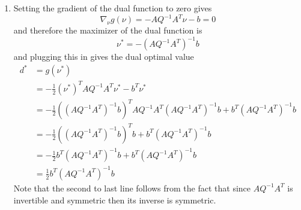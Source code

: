\documentclass[11pt]{amsart}
\begin{document}
\begin{enumerate}
\begin{enumerate}








\item Setting the gradient of the dual function to zero gives
\[
\nabla_{\nu}g(\nu) = -AQ^{-1}A^T \nu - b = 0
\]
and therefore the maximizer of the dual function is 
\[
\nu^* = -(AQ^{-1}A^T)^{-1}b
\]
and plugging this in gives the dual optimal value
\begin{align*}
d^* &= g(\nu^*)\\
&= -\frac{1}{2} (\nu^*)^T  AQ^{-1}A^T \nu^* - b^T \nu^*\\
&= -\frac{1}{2} ((AQ^{-1}A^T)^{-1}b)^T AQ^{-1}A^T (AQ^{-1}A^T)^{-1}b + b^T(AQ^{-1}A^T)^{-1}b\\
&= -\frac{1}{2} ((AQ^{-1}A^T)^{-1}b)^Tb + b^T(AQ^{-1}A^T)^{-1}b\\
&= -\frac{1}{2} b^T (AQ^{-1}A^T)^{-1}b + b^T(AQ^{-1}A^T)^{-1}b\\
&= \frac{1}{2} b^T (AQ^{-1}A^T)^{-1}b
\end{align*}
Note that the second to last line follows from the fact that since $AQ^{-1}A^T$ is invertible and symmetric then its inverse is symmetric.







\end{enumerate}
\end{enumerate}
\end{document}
